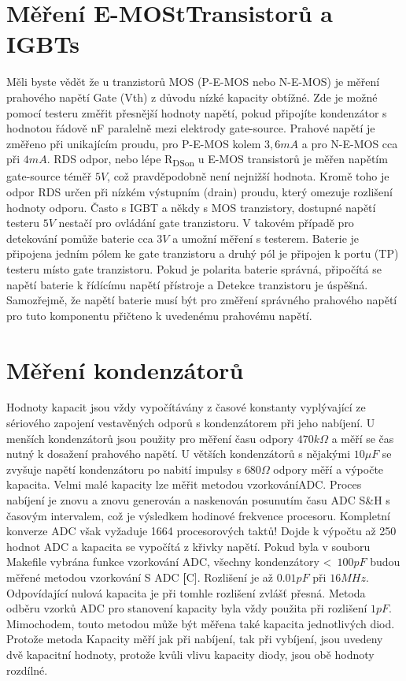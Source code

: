 \section{Měření E-MOStTransistorů a IGBTs}
Měli byste vědět že u tranzistorů MOS (P-E-MOS nebo N-E-MOS) je měření prahového napětí
Gate (Vth) z důvodu nízké kapacity obtížné.
Zde je možné pomocí testeru změřit přesnější hodnoty napětí, pokud připojíte
kondenzátor s hodnotou řádově nF paralelně mezi elektrody gate-source.
Prahové napětí je změřeno při unikajícím proudu, pro P-E-MOS kolem \(3,6mA\) a pro N-E-MOS cca při \(4mA\).
RDS odpor, nebo lépe R\textsubscript{DSon} u E-MOS transistorů je měřen napětím gate-source téměř \(5V\),
což pravděpodobně není nejnižší hodnota.
Kromě toho je odpor RDS určen při nízkém výstupním (drain) proudu, který omezuje rozlišení hodnoty odporu.
Často s IGBT a někdy s MOS tranzistory, dostupné napětí testeru \(5V\) nestačí pro ovládání gate tranzistoru.
V takovém případě pro detekování pomůže baterie cca \(3V\) a umožní měření s testerem.
Baterie je připojena jedním pólem ke gate tranzistoru a druhý pól je připojen k portu (TP) testeru
místo gate tranzistoru.
Pokud je polarita baterie správná,  připočítá se napětí baterie k řídícímu napětí přístroje a
Detekce tranzistoru je úspěšná.
Samozřejmě, že napětí baterie musí být pro změření správného prahového napětí pro tuto
komponentu přičteno k uvedenému prahovému napětí.

\section{Měření kondenzátorů}
Hodnoty kapacit jsou vždy vypočítávány z časové konstanty vyplývající ze sériového zapojení
vestavěných odporů s kondenzátorem při jeho nabíjení.
U menších kondenzátorů jsou použity pro měření času odpory \(470k\Omega\) a měří se čas
nutný k dosažení prahového napětí.
U větších kondenzátorů s nějakými \(10\mu F\) se zvyšuje napětí kondenzátoru po nabití
impulsy s \(680\Omega\) odpory měří a výpočte kapacita.
Velmi malé kapacity lze měřit metodou vzorkováníADC. 
Proces nabíjení je znovu a znovu generován a naskenován posunutím času  ADC S\&H s časovým intervalem,
což je výsledkem hodinové frekvence procesoru.
Kompletní konverze ADC však vyžaduje 1664 procesorových taktů!
Dojde k výpočtu až 250 hodnot ADC a kapacita se vypočítá z křivky napětí.
Pokud byla v souboru Makefile vybrána funkce vzorkování ADC, všechny kondenzátory
\textless~\(100pF\) budou měřené metodou vzorkování S ADC {\textbf[C]}.
Rozlišení je až \(0.01pF\) při \(16MHz\).
Odpovídající nulová kapacita je při tomhle rozlišení zvlášť přesná.
Metoda odběru vzorků ADC pro stanovení kapacity byla vždy použita při rozlišení \(1pF\).
Mimochodem, touto metodou může být měřena také kapacita jednotlivých diod.
Protože metoda Kapacity měří jak při nabíjení, tak při vybíjení, jsou uvedeny dvě kapacitní hodnoty,
protože kvůli vlivu kapacity diody, jsou obě hodnoty rozdílné.

